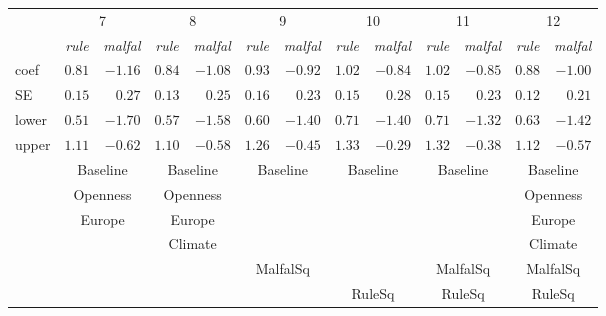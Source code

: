  \vspace{2em} \begin{tabular}{lrrrrrrrrrrrr}
\hline \hline 
& \multicolumn{2}{c}{7} & \multicolumn{2}{c}{8} & \multicolumn{2}{c}{9} & \multicolumn{2}{c}{10} & \multicolumn{2}{c}{11} & \multicolumn{2}{c}{12}\\ 
& \multicolumn{1}{c}{\emph{rule}} & \multicolumn{1}{c}{\emph{malfal}} & \multicolumn{1}{c}{\emph{rule}} & \multicolumn{1}{c}{\emph{malfal}} & \multicolumn{1}{c}{\emph{rule}} & \multicolumn{1}{c}{\emph{malfal}} & \multicolumn{1}{c}{\emph{rule}} & \multicolumn{1}{c}{\emph{malfal}} & \multicolumn{1}{c}{\emph{rule}} & \multicolumn{1}{c}{\emph{malfal}} & \multicolumn{1}{c}{\emph{rule}} & \multicolumn{1}{c}{\emph{malfal}}\\ 
 \hline 
 
coef & $0.81$ & $-1.16$ & $0.84$ & $-1.08$ & $0.93$ & $-0.92$ & $1.02$ & $-0.84$ & $1.02$ & $-0.85$ & $0.88$ & $-1.00$\\ 
SE & $0.15$ & $0.27$ & $0.13$ & $0.25$ & $0.16$ & $0.23$ & $0.15$ & $0.28$ & $0.15$ & $0.23$ & $0.12$ & $0.21$\\ 
lower & $0.51$ & $-1.70$ & $0.57$ & $-1.58$ & $0.60$ & $-1.40$ & $0.71$ & $-1.40$ & $0.71$ & $-1.32$ & $0.63$ & $-1.42$\\ 
upper & $1.11$ & $-0.62$ & $1.10$ & $-0.58$ & $1.26$ & $-0.45$ & $1.33$ & $-0.29$ & $1.32$ & $-0.38$ & $1.12$ & $-0.57$\\ 
& \multicolumn{2}{c}{Baseline} & \multicolumn{2}{c}{Baseline} & \multicolumn{2}{c}{Baseline} & \multicolumn{2}{c}{Baseline} & \multicolumn{2}{c}{Baseline} & \multicolumn{2}{c}{Baseline}\\ 
& \multicolumn{2}{c}{Openness} & \multicolumn{2}{c}{Openness} & \multicolumn{2}{c}{} & \multicolumn{2}{c}{} & \multicolumn{2}{c}{} & \multicolumn{2}{c}{Openness}\\ 
& \multicolumn{2}{c}{Europe} & \multicolumn{2}{c}{Europe} & \multicolumn{2}{c}{} & \multicolumn{2}{c}{} & \multicolumn{2}{c}{} & \multicolumn{2}{c}{Europe}\\ 
& \multicolumn{2}{c}{} & \multicolumn{2}{c}{Climate} & \multicolumn{2}{c}{} & \multicolumn{2}{c}{} & \multicolumn{2}{c}{} & \multicolumn{2}{c}{Climate}\\ 
& \multicolumn{2}{c}{} & \multicolumn{2}{c}{} & \multicolumn{2}{c}{MalfalSq} & \multicolumn{2}{c}{} & \multicolumn{2}{c}{MalfalSq} & \multicolumn{2}{c}{MalfalSq}\\ 
& \multicolumn{2}{c}{} & \multicolumn{2}{c}{} & \multicolumn{2}{c}{} & \multicolumn{2}{c}{RuleSq} & \multicolumn{2}{c}{RuleSq} & \multicolumn{2}{c}{RuleSq}\\ 
 \hline
\end{tabular}